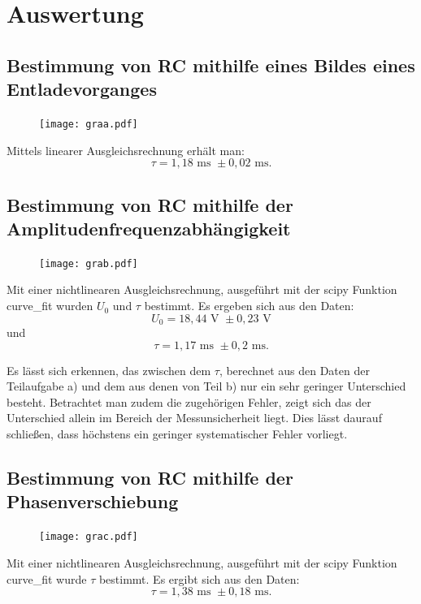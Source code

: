 \section{Auswertung}
\label{sec:Auswertung}

\subsection{Bestimmung von RC mithilfe eines Bildes eines Entladevorganges}
\begin{figure}[H]
	\centering
	\caption{}
	\texttt{[image: graa.pdf]}
	\label{fig:grab}
\end{figure}


Mittels linearer Ausgleichsrechnung erhält man:
\begin{displaymath}
\tau = 1,18 \text{ ms } \pm 0,02 \text{ ms.} 
\end{displaymath}
\subsection{Bestimmung von RC mithilfe der Amplitudenfrequenzabhängigkeit}
\begin{figure}[H]
	\centering
	\caption{}
	\texttt{[image: grab.pdf]}
	\label{fig:grab}
\end{figure}


Mit einer nichtlinearen Ausgleichsrechnung, ausgeführt mit der scipy Funktion
curve\_fit wurden $U_0$ und $\tau$ bestimmt. Es ergeben sich aus den Daten:
\begin{displaymath}
U_0 = 18,44 \text{ V } \pm 0,23 \text{ V}
\end{displaymath}
und
\begin{displaymath}
\tau = 1,17  \text{ ms } \pm 0,2 \text{ ms.}
\end{displaymath}



Es lässt sich erkennen, das zwischen dem $\tau$, berechnet aus den Daten der
 Teilaufgabe a) und dem aus denen von Teil b) nur ein sehr geringer Unterschied
  besteht. Betrachtet man zudem die zugehörigen Fehler, zeigt sich das der
	Unterschied allein im Bereich der Messunsicherheit liegt. Dies lässt daurauf
	 schließen, dass höchstens ein geringer systematischer Fehler vorliegt.

\subsection{Bestimmung von RC mithilfe der Phasenverschiebung}
	 \begin{figure}[H]
	 	\centering
	 	\caption{}
	 	\texttt{[image: grac.pdf]}
	 	\label{fig:grab}
	 \end{figure}
	 
	 Mit einer nichtlinearen Ausgleichsrechnung, ausgeführt mit der scipy Funktion
	 curve\_fit wurde $\tau$ bestimmt. Es ergibt sich aus den Daten:
	 \begin{displaymath}
	 \tau = 1,38  \text{ ms } \pm 0,18 \text{ ms.}
	 \end{displaymath}
	 

